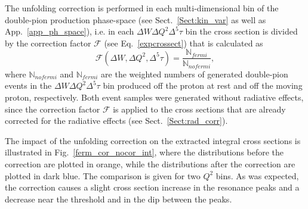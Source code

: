 



The unfolding correction is performed in each multi-dimensional bin of the double-pion production phase-space (see Sect.~\ref{Sect:kin_var} as well as App.~\ref{app_ph_space}), i.e. in each $\Delta W \Delta Q^{2}\Delta^{5}\tau$ bin the cross section is divided by the correction factor $\mathcal{F}$ (see  Eq.~\eqref{expcrossect}) that is calculated as
\begin{equation}
\mathcal{F}(\Delta W, \Delta Q^{2},\Delta^{5}\tau) = \frac{\mathbb{N}_{fermi}}{\mathbb{N}_{nofermi}},
\label{eq:ferm_corr}
\end{equation}
where $\mathbb{N}_{nofermi}$ and $\mathbb{N}_{fermi}$ are the weighted numbers of generated double-pion events in the $\Delta W \Delta Q^{2}\Delta^{5}\tau$ bin produced off the proton at rest and off the moving proton, respectively. Both event samples were generated without radiative effects, since the correction factor $\mathcal{F}$ is applied to the cross sections that are already corrected for the radiative effects (see Sect.~\ref{Sect:rad_corr}).


The impact of the unfolding correction on the extracted integral cross sections is illustrated in Fig.~\ref{ferm_cor_nocor_int}, where the distributions before the correction are plotted in orange, while the distributions after the correction are plotted in dark blue. The comparison is given for two $Q^{2}$ bins. As was expected, the correction causes a slight cross section increase in the resonance peaks and a decrease near the threshold and in the dip between the peaks. 

